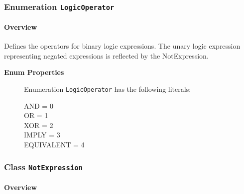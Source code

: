 \subsubsection{\Large{Enumeration \bfseries \texttt{LogicOperator}\normalfont}}
\label{cls:modeling::expressions::LogicOperator} 
\paragraph{Overview}
	
			
Defines the operators for binary logic expressions. The unary logic expression representing negated expressions is reflected by the NotExpression.	
		
	


\begin{description}

	\item[\textbf{Enum Properties}] Enumeration \texttt{LogicOperator} has the following literals:

	\begin{description}
		
		\item[AND = 0]
		\hspace{\fill}
		\nopagebreak

		\item[OR = 1]
		\hspace{\fill}
		\nopagebreak

		\item[XOR = 2]
		\hspace{\fill}
		\nopagebreak

		\item[IMPLY = 3]
		\hspace{\fill}
		\nopagebreak

		\item[EQUIVALENT = 4]
		\hspace{\fill}
		\nopagebreak
 
	\end{description}

\end{description}



\subsubsection{\Large{Class \bfseries \texttt{NotExpression}\normalfont}}
\label{cls:modeling::expressions::NotExpression} 
\paragraph{Overview}

